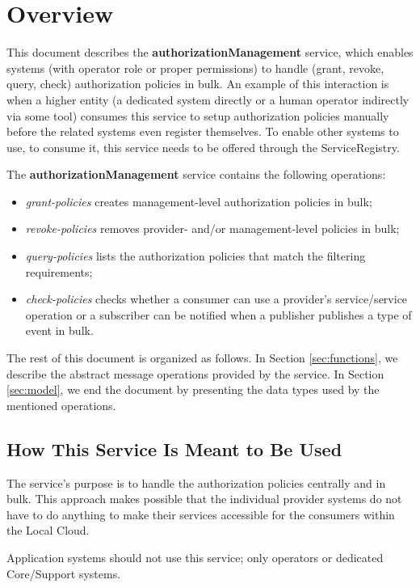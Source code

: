 \documentclass[a4paper]{arrowhead}
\begin{document}
\section{Overview}
\label{sec:overview}
This document describes the \textbf{authorizationManagement} service, which enables systems (with operator role or proper permissions) to handle (grant, revoke, query, check) authorization policies in bulk. An example of this interaction is when a higher entity (a dedicated system directly or a human operator indirectly via some tool) consumes this service to setup authorization policies manually before the related systems even register themselves. To enable other systems to use, to consume it, this service needs to be offered through the ServiceRegistry.

The \textbf{authorizationManagement} service contains the following operations:

\begin{itemize}
    \item \textit{grant-policies} creates management-level authorization policies in bulk;
    \item \textit{revoke-policies} removes provider- and/or management-level policies in bulk;
    \item \textit{query-policies} lists the authorization policies that match the filtering requirements;
    \item \textit{check-policies} checks whether a consumer can use a provider's service/service operation or a subscriber can be notified when a publisher publishes a type of event in bulk.
\end{itemize}

The rest of this document is organized as follows.
In Section \ref{sec:functions}, we describe the abstract message operations provided by the service.
In Section \ref{sec:model}, we end the document by presenting the data types used by the mentioned operations.

\subsection{How This Service Is Meant to Be Used}
The service’s purpose is to handle the authorization policies centrally and in bulk. This approach makes possible that the individual provider systems do not have to do anything to make their services accessible for the consumers within the Local Cloud.

Application systems should not use this service; only operators or dedicated Core/Support systems.
\end{document}
